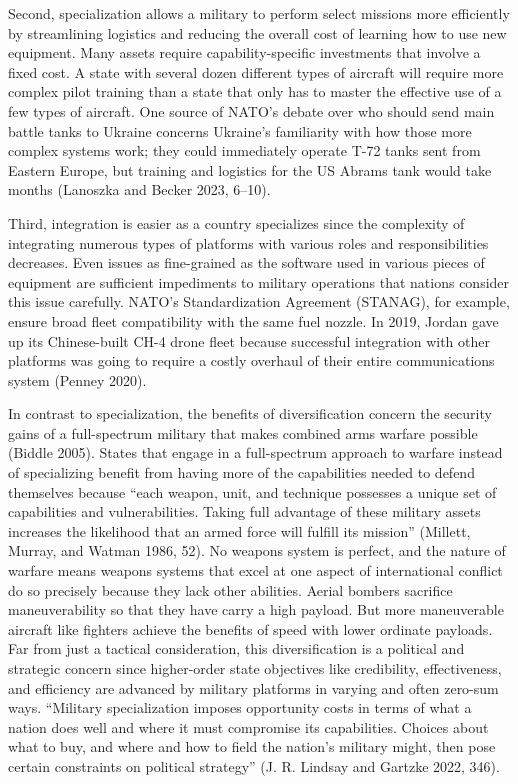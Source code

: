 \documentclass[
  12,
  letterpaper,
  DIV=11,
  numbers=noendperiod]{scrartcl}
\begin{document}
Second, specialization allows a military to perform select missions more
efficiently by streamlining logistics and reducing the overall cost of
learning how to use new equipment. Many assets require
capability-specific investments that involve a fixed cost. A state with
several dozen different types of aircraft will require more complex
pilot training than a state that only has to master the effective use of
a few types of aircraft. One source of NATO's debate over who should
send main battle tanks to Ukraine concerns Ukraine's familiarity with
how those more complex systems work; they could immediately operate T-72
tanks sent from Eastern Europe, but training and logistics for the US
Abrams tank would take months (Lanoszka and Becker 2023, 6--10).

Third, integration is easier as a country specializes since the
complexity of integrating numerous types of platforms with various roles
and responsibilities decreases. Even issues as fine-grained as the
software used in various pieces of equipment are sufficient impediments
to military operations that nations consider this issue carefully.
NATO's Standardization Agreement (STANAG), for example, ensure broad
fleet compatibility with the same fuel nozzle. In 2019, Jordan gave up
its Chinese-built CH-4 drone fleet because successful integration with
other platforms was going to require a costly overhaul of their entire
communications system (Penney 2020).

In contrast to specialization, the benefits of diversification concern
the security gains of a full-spectrum military that makes combined arms
warfare possible (Biddle 2005). States that engage in a full-spectrum
approach to warfare instead of specializing benefit from having more of
the capabilities needed to defend themselves because ``each weapon,
unit, and technique possesses a unique set of capabilities and
vulnerabilities. Taking full advantage of these military assets
increases the likelihood that an armed force will fulfill its mission''
(Millett, Murray, and Watman 1986, 52). No weapons system is perfect,
and the nature of warfare means weapons systems that excel at one aspect
of international conflict do so precisely because they lack other
abilities. Aerial bombers sacrifice maneuverability so that they have
carry a high payload. But more maneuverable aircraft like fighters
achieve the benefits of speed with lower ordinate payloads. Far from
just a tactical consideration, this diversification is a political and
strategic concern since higher-order state objectives like credibility,
effectiveness, and efficiency are advanced by military platforms in
varying and often zero-sum ways. ``Military specialization imposes
opportunity costs in terms of what a nation does well and where it must
compromise its capabilities. Choices about what to buy, and where and
how to field the nation's military might, then pose certain constraints
on political strategy'' (J. R. Lindsay and Gartzke 2022, 346).
\end{document}
